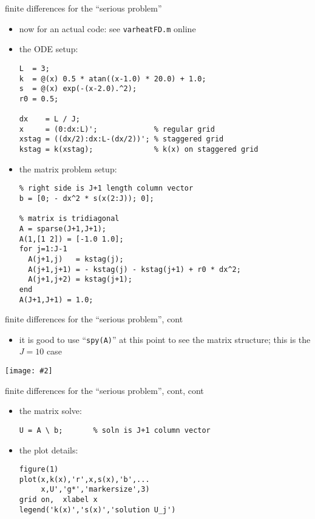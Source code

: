 \documentclass[10pt,hyperref]{beamer}
\newcommand{\centerimage}[2]{\begin{center}
\texttt{[image: \#2]}
\end{center}}
\begin{document}
\begin{frame}[fragile]{finite differences for the ``serious problem''} 

\begin{itemize}
\item now for an actual code: see \texttt{varheatFD.m} online
\item the ODE setup:
\scriptsize
\begin{verbatim}
L  = 3;
k  = @(x) 0.5 * atan((x-1.0) * 20.0) + 1.0;
s  = @(x) exp(-(x-2.0).^2);
r0 = 0.5;

dx    = L / J;
x     = (0:dx:L)';             % regular grid
xstag = ((dx/2):dx:L-(dx/2))'; % staggered grid
kstag = k(xstag);              % k(x) on staggered grid
\end{verbatim}
\normalsize
\item the matrix problem setup:
\scriptsize
\begin{verbatim}
% right side is J+1 length column vector
b = [0; - dx^2 * s(x(2:J)); 0];

% matrix is tridiagonal
A = sparse(J+1,J+1);
A(1,[1 2]) = [-1.0 1.0];
for j=1:J-1
  A(j+1,j)   = kstag(j);
  A(j+1,j+1) = - kstag(j) - kstag(j+1) + r0 * dx^2; 
  A(j+1,j+2) = kstag(j+1);
end
A(J+1,J+1) = 1.0;
\end{verbatim}
\normalsize
\end{itemize}
\end{frame}


\begin{frame}{finite differences for the ``serious problem'', cont} 

\begin{itemize}
\item it is good to use ``\texttt{spy(A)}'' at this point to see the matrix structure; this is the $J=10$ case
\end{itemize}

\centerimage{0.55}{spyFD-crop}
\end{frame}


\begin{frame}[fragile]{finite differences for the ``serious problem'', cont, cont} 

\begin{itemize}
\item the matrix solve:
\small
\begin{verbatim}
U = A \ b;       % soln is J+1 column vector
\end{verbatim}
\normalsize
\bigskip

\item the plot details:
\small
\begin{verbatim}
figure(1)
plot(x,k(x),'r',x,s(x),'b',...
     x,U','g*','markersize',3)
grid on,  xlabel x
legend('k(x)','s(x)','solution U_j')
\end{verbatim}
\normalsize
\end{itemize}
\end{frame}
\end{document}
